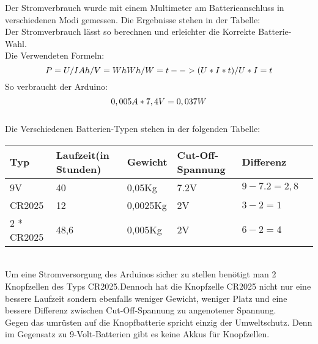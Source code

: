 Der Stromverbrauch wurde mit einem Multimeter am Batterieanschluss in
verschiedenen Modi gemessen. Die Ergebnisse stehen in der Tabelle:\\


Der Stromverbrauch lässt so berechnen und erleichter die Korrekte Batterie-Wahl.
\\
Die Verwendeten Formeln: 
\begin{equation}
    $$
    P = U / I
    Ah / V = Wh
    Wh / W = t --> (U*I*t) / U*I = t
    $$
\end{equation}
So verbraucht der Arduino:
\begin{equation}
    $$
    0,005 A * 7,4 V = 0,037 W
    $$
\end{equation}
\\
Die Verschiedenen Batterien-Typen stehen in der folgenden Tabelle:\\
\begin{tabularx}{0.8\textwidth}{l|X|X|X|XX}
    Typ & Laufzeit(in Stunden) & Gewicht & Cut-Off-Spannung & Differenz\\
    \hline
    9V & 40 & 0,05Kg &7.2V & $9-7.2 = 2,8$\\
    \hline
    CR2025 & 12 & 0,0025Kg & 2V & $3-2 = 1$\\
    \hline
    2 * CR2025 & 48,6 & 0,005Kg & 2V & $6-2 = 4$\\
\end{tabularx}
\\
Um eine Stromversorgung des Arduinos sicher zu stellen benötigt man 2 Knopfzellen
des Typs CR2025.Dennoch hat die Knopfzelle CR2025 nicht nur eine bessere 
Laufzeit sondern ebenfalls weniger Gewicht, weniger Platz und eine bessere 
Differenz zwischen Cut-Off-Spannung zu angenotener Spannung.
\\
Gegen das umrüsten auf die Knopfbatterie spricht einzig der Umweltschutz. 
Denn im Gegensatz zu 9-Volt-Batterien gibt es keine Akkus für Knopfzellen.